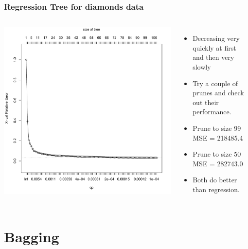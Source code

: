 \documentclass{beamer}
\begin{document}
\begin{frame}
	\frametitle{Regression Tree for diamonds data}
	\begin{columns}[c] 
			\includegraphics{cpdia.pdf}
			\begin{itemize}
				\item Decreasing very quickly at first and then very slowly
				\item Try a couple of prunes and check out their performance.
				\item Prune to size 99
				MSE =  218485.4
				
				\item Prune to size 50
				MSE = 282743.0
				
				\item Both do better than regression.
			\end{itemize}
	\end{columns}

\end{frame}

\section{Bagging}
\end{document}
